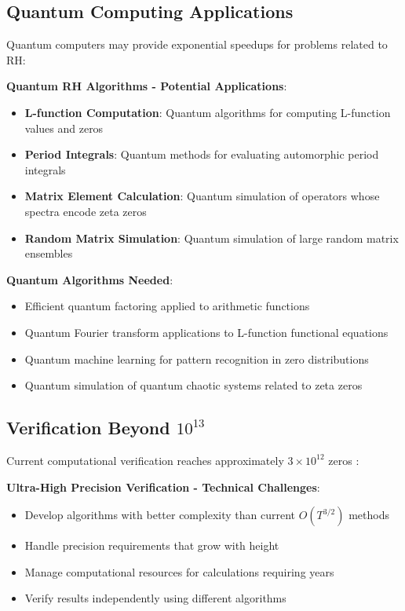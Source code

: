 \subsection{Quantum Computing Applications}
\label{subsec:quantum_computing}

Quantum computers may provide exponential speedups for problems related to RH:

\noindent\textbf{Quantum RH Algorithms - Potential Applications}:
\begin{itemize}
\item \textbf{L-function Computation}: Quantum algorithms for computing L-function values and zeros
\item \textbf{Period Integrals}: Quantum methods for evaluating automorphic period integrals
\item \textbf{Matrix Element Calculation}: Quantum simulation of operators whose spectra encode zeta zeros
\item \textbf{Random Matrix Simulation}: Quantum simulation of large random matrix ensembles
\end{itemize}

\textbf{Quantum Algorithms Needed}:
\begin{itemize}
\item Efficient quantum factoring applied to arithmetic functions
\item Quantum Fourier transform applications to L-function functional equations
\item Quantum machine learning for pattern recognition in zero distributions
\item Quantum simulation of quantum chaotic systems related to zeta zeros
\end{itemize}

\subsection{Verification Beyond $10^{13}$}
\label{subsec:verification_beyond}

Current computational verification reaches approximately $3 \times 10^{12}$ zeros \cite{plattrigaux2020}:

\noindent\textbf{Ultra-High Precision Verification - Technical Challenges}:
\begin{itemize}
\item Develop algorithms with better complexity than current $O(T^{3/2})$ methods
\item Handle precision requirements that grow with height
\item Manage computational resources for calculations requiring years
\item Verify results independently using different algorithms
\end{itemize}


